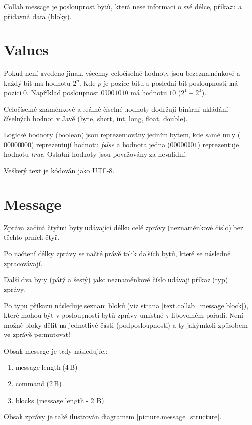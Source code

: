 \documentclass[12pt,oneside,a4paper]{report}
\begin{document}
Collab message je posloupnost bytů, která nese informaci o své délce, příkazu a přídavná data (bloky).

\section{Values}

Pokud není uvedeno jinak, všechny celočíselné hodnoty jsou bezeznaménkové a každý bit má hodnotu $2^{p}$. Kde $p$ je pozice bitu a poslední bit posloupnosti má pozici $0$. Například posloupnost $00001010$ má hodnotu $10$ ($2^1 + 2^3$).

Celočíselné znaménkové a reálné číselné hodnoty dodržují binární ukládání číselných hodnot v Javě (byte, short, int, long, float, double).

Logické hodnoty (boolean) jsou reprezentovány jedním bytem, kde samé nuly ($00000000$) reprezentují hodnotu \emph{false} a hodnota jedna ($00000001$) reprezentuje hodnotu \emph{true}. Ostatní hodnoty jsou považovány za nevalidní.

Veškerý text je kódován jako UTF-8.

\section{Message}

Zpráva začíná čtyřmi byty udávající délku celé zprávy (neznaménkové číslo) bez těchto prních čtyř.

Po načtení délky zprávy se načté právě tolik dalších bytů, které se následně zpracovávají.

Další dva byty (pátý a šestý) jako neznaménkové číslo udávají příkaz (typ) zprávy.

Po typu příkazu následuje seznam bloků (viz strana \ref{text.collab_message.block}), které mohou být v posloupnosti bytů zprávy umístné v libovolném pořadí. Není možné bloky dělit na jednotlivé části (podposloupnosti) a ty jakýmkoli způsobem ve zprávě permutovat!

Obsah message je tedy následující:

\begin{enumerate}
	\item message length (4\,{}B)
	\item command (2\,{}B)
	\item blocks (message length - 2 B)
\end{enumerate}

Obsah zprávy je také ilustrován diagramem \ref{picture.message_structure}.
\end{document}
